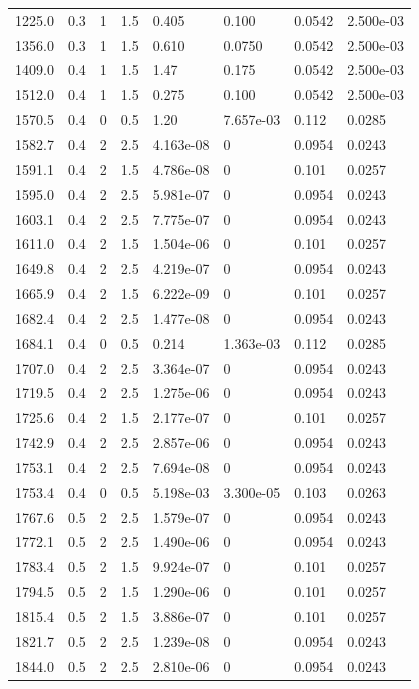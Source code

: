 \documentclass[preview]{standalone}
\begin{document}
{{\begin{tabular}{L{1.2cm}C{1.2cm} C{0.3cm}C{0.5cm} C{1.4cm}C{1.4cm} C{1.4cm}C{1.4cm}}
  1225.0  &   0.3  & 1     & 1.5 &  0.405  & 0.100  & 0.0542 &  2.500e-03   \\ 
  1356.0  &   0.3  & 1     & 1.5 &  0.610  & 0.0750  & 0.0542 &  2.500e-03   \\ 
  1409.0  &   0.4  & 1     & 1.5 &  1.47  & 0.175  & 0.0542 &  2.500e-03   \\ 
  1512.0  &   0.4  & 1     & 1.5 &  0.275  & 0.100  & 0.0542 &  2.500e-03   \\ 
  1570.5  &   0.4  & 0     & 0.5 &  1.20  & 7.657e-03  & 0.112 &  0.0285   \\ 
  1582.7  &   0.4  & 2     & 2.5 &  4.163e-08  & 0  & 0.0954 &  0.0243   \\ 
  1591.1  &   0.4  & 2     & 1.5 &  4.786e-08  & 0  & 0.101 &  0.0257   \\ 
  1595.0  &   0.4  & 2     & 2.5 &  5.981e-07  & 0  & 0.0954 &  0.0243   \\ 
  1603.1  &   0.4  & 2     & 2.5 &  7.775e-07  & 0  & 0.0954 &  0.0243   \\ 
  1611.0  &   0.4  & 2     & 1.5 &  1.504e-06  & 0  & 0.101 &  0.0257   \\ 
  1649.8  &   0.4  & 2     & 2.5 &  4.219e-07  & 0  & 0.0954 &  0.0243   \\ 
  1665.9  &   0.4  & 2     & 1.5 &  6.222e-09  & 0  & 0.101 &  0.0257   \\ 
  1682.4  &   0.4  & 2     & 2.5 &  1.477e-08  & 0  & 0.0954 &  0.0243   \\ 
  1684.1  &   0.4  & 0     & 0.5 &  0.214  & 1.363e-03  & 0.112 &  0.0285   \\ 
  1707.0  &   0.4  & 2     & 2.5 &  3.364e-07  & 0  & 0.0954 &  0.0243   \\ 
  1719.5  &   0.4  & 2     & 2.5 &  1.275e-06  & 0  & 0.0954 &  0.0243   \\ 
  1725.6  &   0.4  & 2     & 1.5 &  2.177e-07  & 0  & 0.101 &  0.0257   \\ 
  1742.9  &   0.4  & 2     & 2.5 &  2.857e-06  & 0  & 0.0954 &  0.0243   \\ 
  1753.1  &   0.4  & 2     & 2.5 &  7.694e-08  & 0  & 0.0954 &  0.0243   \\ 
  1753.4  &   0.4  & 0     & 0.5 &  5.198e-03  & 3.300e-05  & 0.103 &  0.0263   \\ 
  1767.6  &   0.5  & 2     & 2.5 &  1.579e-07  & 0  & 0.0954 &  0.0243   \\ 
  1772.1  &   0.5  & 2     & 2.5 &  1.490e-06  & 0  & 0.0954 &  0.0243   \\ 
  1783.4  &   0.5  & 2     & 1.5 &  9.924e-07  & 0  & 0.101 &  0.0257   \\ 
  1794.5  &   0.5  & 2     & 1.5 &  1.290e-06  & 0  & 0.101 &  0.0257   \\ 
  1815.4  &   0.5  & 2     & 1.5 &  3.886e-07  & 0  & 0.101 &  0.0257   \\ 
  1821.7  &   0.5  & 2     & 2.5 &  1.239e-08  & 0  & 0.0954 &  0.0243   \\ 
  1844.0  &   0.5  & 2     & 2.5 &  2.810e-06  & 0  & 0.0954 &  0.0243   \\ 
\hline 
\end{tabular} 

}}
\end{document}
